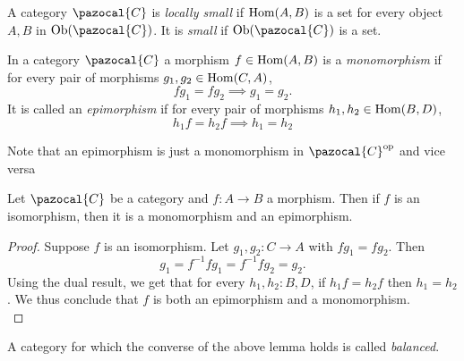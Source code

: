 \begin{definition}
    A category $\pazocal{C}$ is \textit{locally small} if $\mathrm{Hom}(A,B)$ is a set for every object $A,B$ in $\Ob(\pazocal{C})$. It is \textit{small} if $\Ob(\pazocal{C})$ is a set.
\end{definition}
\begin{definition}
    In a category $\pazocal{C}$ a morphism $f\in \mathrm{Hom}(A,B)$ is a \textit{monomorphism} if for every pair of morphisms $g_1,g_2 \in \mathrm{Hom}(C,A)$, 
    $$fg_1=fg_2\implies g_1 = g_2.$$
    It is called an \textit{epimorphism} if for every pair of morphisms $h_1,h_2\in \mathrm{Hom}(B,D)$,
    $$h_1f=h_2f\implies h_1=h_2$$    
\end{definition}
\begin{remark}
    Note that an epimorphism is just a monomorphism in $\pazocal{C}\op$ and vice versa
\end{remark}\label{IsomorphismIsEpiAndMono}
\begin{lemma}
    Let $\pazocal{C}$ be a category and $f:A\rightarrow B$ a morphism. Then if $f$ is an isomorphism, then it is a monomorphism and an epimorphism.
\end{lemma}
\begin{proof}
    Suppose $f$ is an isomorphism. Let $g_1,g_2: C \rightarrow A$ with $fg_1=fg_2$. Then 
    $$
        g_1=f^{-1}fg_1 = f^{-1}fg_2 = g_2.
    $$
    Using the dual result, we get that for every $h_1,h_2: B,D$, if $h_1f=h_2f$ then $h_1=h_2$. We thus conclude that $f$ is both an epimorphism and a monomorphism.\\
\end{proof}

\begin{definition}
    A category for which the converse of the above lemma holds is called \emph{balanced}.
\end{definition}

